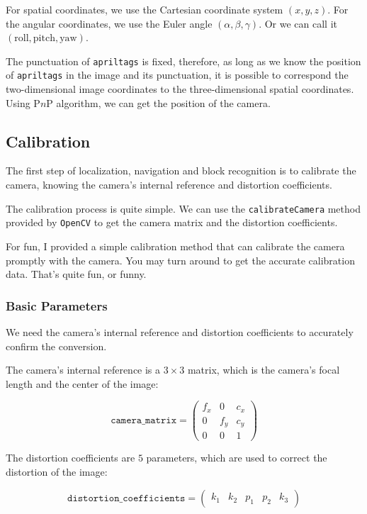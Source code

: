 \documentclass{article}
\begin{document}
For spatial coordinates, we use the Cartesian coordinate system $\left(x,y,z\right)$. For the angular coordinates, we use the Euler angle $\left(\alpha,\beta,\gamma\right)$. Or we can call it $\left(\mathrm{roll},\mathrm{pitch},\mathrm{yaw}\right)$.

The punctuation of \texttt{apriltags} is fixed, therefore, as long as we know the position of \texttt{apriltags} in the image and its punctuation, it is possible to correspond the two-dimensional image coordinates to the three-dimensional spatial coordinates. Using P$n$P algorithm, we can get the position of the camera.

\subsection{Calibration}

The first step of localization, navigation and block recognition is to calibrate the camera, knowing the camera's internal reference and distortion coefficients.

The calibration process is quite simple. We can use the \texttt{calibrateCamera} method provided by \texttt{OpenCV} to get the camera matrix and the distortion coefficients.

For fun, I provided a simple calibration method that can calibrate the camera promptly with the camera. You may turn around to get the accurate calibration data. That's quite fun, or funny.

\subsubsection{Basic Parameters}
We need the camera's internal reference and distortion coefficients to accurately confirm the conversion.

The camera's internal reference is a $3\times3$ matrix, which is the camera's focal length and the center of the image:

\[
  \texttt{camera\_matrix}=\left(\begin{matrix}
    f_x & 0 & c_x \\
    0 & f_y & c_y \\
    0 & 0 & 1
  \end{matrix}\right)
\]

The distortion coefficients are $5$ parameters, which are used to correct the distortion of the image:

\[
  \texttt{distortion\_coefficients}=\left(\begin{matrix}
    k_1 & k_2 & p_1 & p_2 & k_3
  \end{matrix}\right)
\]
\end{document}
